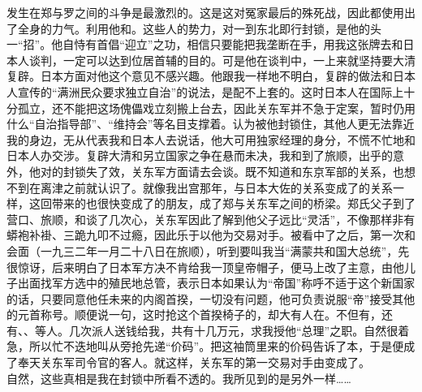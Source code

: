 发生在郑与罗之间的斗争是最激烈的。这是这对冤家最后的殊死战，因此都使用出了全身的力气。利用他和。这些人的势力，对一到东北即行封锁，是他的头一“招”。他自恃有首倡“迎立”之功，相信只要能把我垄断在手，用我这张牌去和日本人谈判，一定可以达到位居首辅的目的。可是他在谈判中，一上来就坚持要大清复辟。日本方面对他这个意见不感兴趣。他跟我一样地不明白，复辟的做法和日本人宣传的“满洲民众要求独立自治”的说法，是配不上套的。这时日本人在国际上十分孤立，还不能把这场傀儡戏立刻搬上台去，因此关东军并不急于定案，暂时仍用什么“自治指导部”、“维持会”等名目支撑着。认为被他封锁住，其他人更无法靠近我的身边，无从代表我和日本人去说话，他大可用独家经理的身分，不慌不忙地和日本人办交涉。复辟大清和另立国家之争在悬而未决，我和到了旅顺，出乎的意外，他对的封锁失了效，关东军方面请去会谈。既不知道和东京军部的关系，也想不到在离津之前就认识了。就像我出宫那年，与日本大佐的关系变成了的关系一样，这回带来的也很快变成了的朋友，成了郑与关东军之间的桥梁。郑氏父子到了营口、旅顺，和谈了几次心，关东军因此了解到他父子远比“灵活”，不像那样非有蟒袍补褂、三跪九叩不过瘾，因此乐于以他为交易对手。被看中了之后，第一次和会面（一九三二年一月二十八日在旅顺），听到要叫我当“满蒙共和国大总统”，先很惊讶，后来明白了日本军方决不肯给我一顶皇帝帽子，便马上改了主意，由他儿子出面找军方选中的殖民地总管，表示日本如果认为“帝国”称呼不适于这个新国家的话，只要同意他任未来的内阁首揆，一切没有问题，他可负责说服“帝”接受其他的元首称号。顺便说一句，这时抢这个首揆椅子的，却大有人在。不但有，还有、、等人。几次派人送钱给我，共有十几万元，求我授他“总理”之职。自然很着急，所以忙不迭地叫从旁抢先递“价码”。把这袖筒里来的价码告诉了本，于是便成了奉天关东军司令官的客人。就这样，关东军的第一交易对手由变成了。\\

自然，这些真相是我在封锁中所看不透的。我所见到的是另外一样……
